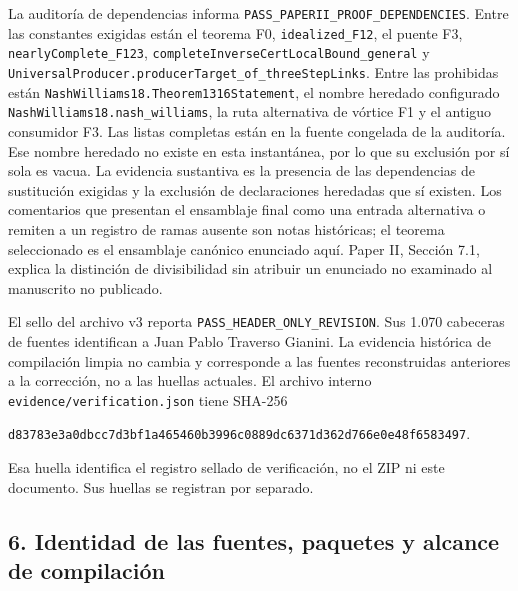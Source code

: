 \documentclass[spanish,11pt,a4paper]{article}
\begin{document}
La auditoría de dependencias informa \texttt{PASS\_\allowbreak{}PAPERII\_\allowbreak{}PROOF\_\allowbreak{}DEPENDENCIES}. Entre las constantes exigidas están el teorema F0, \texttt{idealized\_\allowbreak{}F12}, el puente F3, \texttt{nearly\allowbreak{}Complete\_\allowbreak{}F123}, \texttt{complete\allowbreak{}Inverse\allowbreak{}Cert\allowbreak{}Local\allowbreak{}Bound\_\allowbreak{}general} y \texttt{Universal\allowbreak{}Producer.\allowbreak{}producer\allowbreak{}Target\_\allowbreak{}of\_\allowbreak{}three\allowbreak{}Step\allowbreak{}Links}. Entre las prohibidas están \texttt{Nash\allowbreak{}Williams18.\allowbreak{}Theorem1316Statement}, el nombre heredado configurado \texttt{Nash\allowbreak{}Williams18.\allowbreak{}nash\_\allowbreak{}williams}, la ruta alternativa de vórtice F1 y el antiguo consumidor F3. Las listas completas están en la fuente congelada de la auditoría. Ese nombre heredado no existe en esta instantánea, por lo que su exclusión por sí sola es vacua. La evidencia sustantiva es la presencia de las dependencias de sustitución exigidas y la exclusión de declaraciones heredadas que sí existen. Los comentarios que presentan el ensamblaje final como una entrada alternativa o remiten a un registro de ramas ausente son notas históricas; el teorema seleccionado es el ensamblaje canónico enunciado aquí. Paper II, Sección 7.1, explica la distinción de divisibilidad sin atribuir un enunciado no examinado al manuscrito no publicado.

El sello del archivo v3 reporta \texttt{PASS\_\allowbreak{}HEADER\_\allowbreak{}ONLY\_\allowbreak{}REVISION}. Sus 1.070 cabeceras de fuentes identifican a Juan Pablo Traverso Gianini. La evidencia histórica de compilación limpia no cambia y corresponde a las fuentes reconstruidas anteriores a la corrección, no a las huellas actuales. El archivo interno \texttt{evidence/\allowbreak{}verification.\allowbreak{}json} tiene SHA-256

\texttt{d83783e3\allowbreak{}a0dbcc7d\allowbreak{}3bf1a465\allowbreak{}460b3996\allowbreak{}c0889dc6\allowbreak{}371d362d\allowbreak{}766e0e48\allowbreak{}f6583497}.

Esa huella identifica el registro sellado de verificación, no el ZIP ni este documento. Sus huellas se registran por separado.

\subsection{6. Identidad de las fuentes, paquetes y alcance de compilación}\label{identidad-de-las-fuentes-paquetes-y-alcance-de-compilaciuxf3n}
\end{document}
